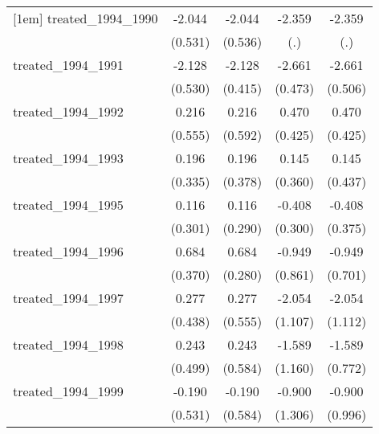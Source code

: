{\begin{tabular}{l*{4}{c}}
[1em]
treated\_1994\_1990&      -2.044\sym{***}&      -2.044\sym{***}&      -2.359         &      -2.359         \\
            &     (0.531)         &     (0.536)         &         (.)         &         (.)         \\
[1em]
treated\_1994\_1991&      -2.128\sym{***}&      -2.128\sym{***}&      -2.661\sym{***}&      -2.661\sym{***}\\
            &     (0.530)         &     (0.415)         &     (0.473)         &     (0.506)         \\
[1em]
treated\_1994\_1992&       0.216         &       0.216         &       0.470         &       0.470         \\
            &     (0.555)         &     (0.592)         &     (0.425)         &     (0.425)         \\
[1em]
treated\_1994\_1993&       0.196         &       0.196         &       0.145         &       0.145         \\
            &     (0.335)         &     (0.378)         &     (0.360)         &     (0.437)         \\
[1em]
treated\_1994\_1995&       0.116         &       0.116         &      -0.408         &      -0.408         \\
            &     (0.301)         &     (0.290)         &     (0.300)         &     (0.375)         \\
[1em]
treated\_1994\_1996&       0.684         &       0.684\sym{*}  &      -0.949         &      -0.949         \\
            &     (0.370)         &     (0.280)         &     (0.861)         &     (0.701)         \\
[1em]
treated\_1994\_1997&       0.277         &       0.277         &      -2.054         &      -2.054         \\
            &     (0.438)         &     (0.555)         &     (1.107)         &     (1.112)         \\
[1em]
treated\_1994\_1998&       0.243         &       0.243         &      -1.589         &      -1.589\sym{*}  \\
            &     (0.499)         &     (0.584)         &     (1.160)         &     (0.772)         \\
[1em]
treated\_1994\_1999&      -0.190         &      -0.190         &      -0.900         &      -0.900         \\
            &     (0.531)         &     (0.584)         &     (1.306)         &     (0.996)         \\

\end{tabular}}
